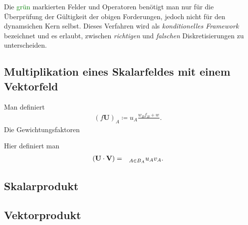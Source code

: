 \documentclass{book}
\let\sum\relax
\DeclareMathOperator*{\sum}{\raisebox{-3.5pt}{\scalebox{2}{\rotatebox{1}{{\bask Σ}}}}}
\begin{document}
%
Die \textcolor{green}{grün} markierten Felder und Operatoren benötigt man nur für die Überprüfung der Gültigkeit der obigen Forderungen, jedoch nicht für den dynamsichen Kern selbst. Dieses Verfahren wird als \textit{konditionelles Framework} bezeichnet und es erlaubt, zwischen \textit{richtigen} und \textit{falschen} Diskretisierungen zu unterscheiden.

\subsection{Multiplikation eines Skalarfeldes mit einem Vektorfeld}
\label{sec_multiplikation_eines_skalarfeldes_mit_einem_vektorfeld}

Man definiert
%
\begin{eqnarray}
\left(f\mathbf{U}\right)_A \coloneqq u_A\frac{w_Bf_B + w_{}}{}.
\end{eqnarray}
%
Die Gewichtungsfaktoren

Hier definiert man
%
\begin{eqnarray}
\left(\mathbf{U}\cdot\mathbf{V}\right) & = & \sum_{A\in B_A}^{}u_Av_A.
\end{eqnarray}

\subsection{Skalarprodukt}
\label{sec:skalarprodukt}

\subsection{Vektorprodukt}
\label{sec:vektorprodukt}
\end{document}
